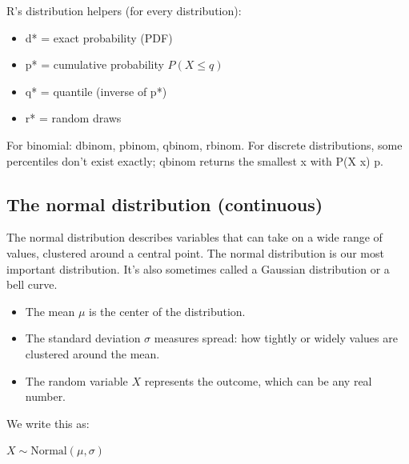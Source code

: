 \documentclass[
  letterpaper,
  DIV=11,
  numbers=noendperiod]{scrreprt}
\providecommand{\tightlist}{%
  \setlength{\itemsep}{0pt}\setlength{\parskip}{0pt}}
\begin{document}
\begin{tcolorbox}[enhanced jigsaw, breakable, colback=white, opacitybacktitle=0.6, coltitle=black, toprule=.15mm, bottomtitle=1mm, leftrule=.75mm, arc=.35mm, title=\textcolor{quarto-callout-note-color}{\faInfo}\hspace{0.5em}{Note}, opacityback=0, colframe=quarto-callout-note-color-frame, left=2mm, titlerule=0mm, toptitle=1mm, colbacktitle=quarto-callout-note-color!10!white, rightrule=.15mm, bottomrule=.15mm]

R's distribution helpers (for every distribution):

\begin{itemize}
\tightlist
\item
  d* = exact probability (PDF)
\item
  p* = cumulative probability \(P(X \le q)\)
\item
  q* = quantile (inverse of p*)
\item
  r* = random draws
\end{itemize}

For binomial: dbinom, pbinom, qbinom, rbinom. For discrete
distributions, some percentiles don't exist exactly; qbinom returns the
smallest x with P(X \le x) \ge p.

\end{tcolorbox}

\subsection{The normal distribution
(continuous)}\label{the-normal-distribution-continuous}

The normal distribution describes variables that can take on a wide
range of values, clustered around a central point. The normal
distribution is our most important distribution. It's also sometimes
called a Gaussian distribution or a bell curve.

\begin{itemize}
\tightlist
\item
  The mean \(\mu\) is the center of the distribution.
\item
  The standard deviation \(\sigma\) measures spread: how tightly or
  widely values are clustered around the mean.
\item
  The random variable \(X\) represents the outcome, which can be any
  real number.
\end{itemize}

We write this as:

\(X \sim \text{Normal}(\mu, \sigma)\)
\end{document}
